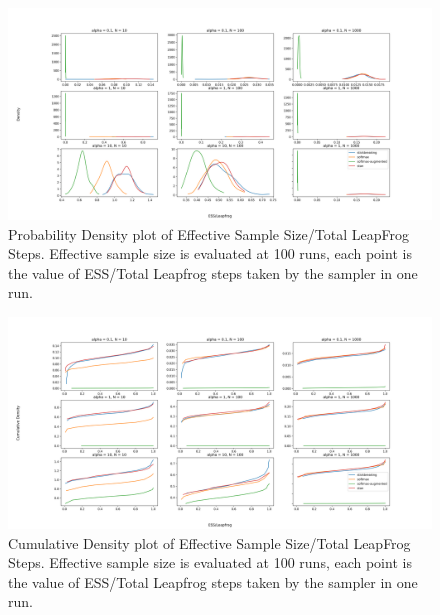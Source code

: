 \documentclass[11pt]{article}
\begin{document}
\begin{figure}[t!]
    \centering
    \includegraphics[width=1.2\textwidth]{figures/simplex/ess_density.png}
    \caption{Probability Density plot of Effective Sample Size/Total LeapFrog Steps. Effective sample size is evaluated at 100 runs, each point is the value of ESS/Total Leapfrog steps taken by the sampler in one run.}
    \label{fig:ess_density}
\end{figure}

\begin{figure}[t!]
    \centering
    \includegraphics[width=1.2\textwidth]{figures/simplex/ess_cdf.png}
    \caption{Cumulative Density plot of Effective Sample Size/Total LeapFrog Steps. Effective sample size is evaluated at 100 runs, each point is the value of ESS/Total Leapfrog steps taken by the sampler in one run.}
    \label{fig:ess_cdf}
\end{figure}
\end{document}
